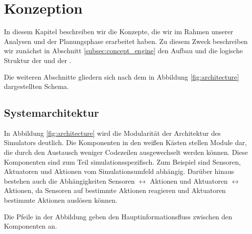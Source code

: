 \chapter{Konzeption}\label{chapter:concept}
In diesem Kapitel beschreiben wir die Konzepte, die wir im Rahmen unserer Analysen und der Planungsphase erarbeitet haben. Zu diesem Zweck beschreiben wir zunächst in Abschnitt \ref{subsec:concept_engine} den Aufbau und die logische Struktur der  und der . 

Die weiteren Abschnitte gliedern sich nach dem in Abbildung \ref{fig:architecture} dargestellten Schema.




\section{Systemarchitektur}\label{sec:architecture}

In Abbildung \ref{fig:architecture} wird die Modularität der Architektur des Simulators deutlich. Die Komponenten in den weißen Kästen stellen Module dar, die durch den Austausch weniger Codezeilen ausgewechselt werden können. Diese Komponenten sind zum Teil simulationsspezifisch. Zum Beispiel sind Sensoren, Aktuatoren und Aktionen vom Simulationsumfeld abhängig. Darüber hinaus bestehen auch die Abhängigkeiten Sensoren $\leftrightarrow$ Aktionen und Aktuatoren $\leftrightarrow$ Aktionen, da Sensoren auf bestimmte Aktionen reagieren und Aktuatoren bestimmte Aktionen auslösen können.

Die Pfeile in der Abbildung geben den Hauptinformationsfluss zwischen den Komponenten an.

